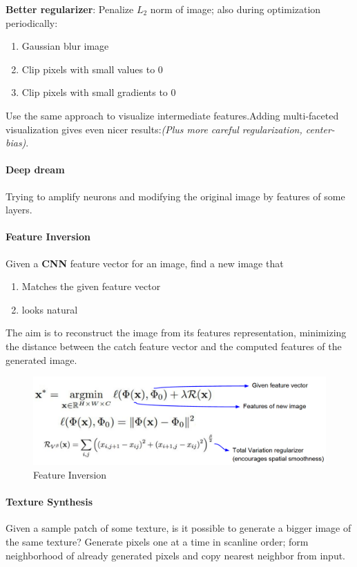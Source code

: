 \documentclass[11pt]{article}
\begin{document}
\textbf{Better regularizer}: Penalize $L_2$ norm of image; also during optimization periodically:
\begin{multicols}{3}
\begin{enumerate}
    \item Gaussian blur image
    \item Clip pixels with small values to 0
    \item Clip pixels with small gradients to 0
\end{enumerate}{}
\end{multicols}{}

Use the same approach to visualize intermediate features.Adding multi-faceted visualization gives even nicer results:\textit{(Plus more careful regularization, center-bias)}.
\paragraph{Deep dream}
Trying to amplify neurons and modifying the original image by features of some layers.
\clearpage
\paragraph{Feature Inversion}
Given a \textbf{CNN} feature vector for an image, find a new image that
\begin{multicols}{2}
\begin{enumerate}
    \item Matches the given feature vector
    \item looks natural
\end{enumerate}{}
\end{multicols}{}
The aim is to reconstruct the image from its features representation, minimizing the distance between  the catch feature vector and the computed features of the generated image.
\begin{figure}[h]
\centering
\captionsetup{justification=centering}
\includegraphics[width=0.7\linewidth]{L1115.pdf}
\caption{ Feature Inversion}
\label{fig:L1115}
\end{figure}
\paragraph{Texture Synthesis}
Given a sample patch of some texture, is it possible to generate a bigger image of the same texture? Generate pixels one at a time in scanline order; form neighborhood of already generated pixels and copy nearest neighbor from input.\\\\
\end{document}
